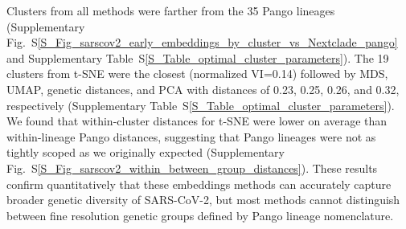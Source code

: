 \documentclass[webpdf,contemporary,large,single]{oup-authoring-template}%
\theoremstyle{thmstyleone}%
\theoremstyle{thmstyletwo}%
\theoremstyle{thmstylethree}%
\begin{document}
Clusters from all methods were farther from the 35 Pango lineages (Supplementary Fig.~S\ref{S_Fig_sarscov2_early_embeddings_by_cluster_vs_Nextclade_pango} and Supplementary Table~S\ref{S_Table_optimal_cluster_parameters}).
The 19 clusters from t-SNE were the closest (normalized VI=0.14) followed by MDS, UMAP, genetic distances, and PCA with distances of 0.23, 0.25, 0.26, and 0.32, respectively (Supplementary Table~S\ref{S_Table_optimal_cluster_parameters}).
We found that within-cluster distances for t-SNE were lower on average than within-lineage Pango distances, suggesting that Pango lineages were not as tightly scoped as we originally expected (Supplementary Fig.~S\ref{S_Fig_sarscov2_within_between_group_distances}).
These results confirm quantitatively that these embeddings methods can accurately capture broader genetic diversity of SARS-CoV-2, but most methods cannot distinguish between fine resolution genetic groups defined by Pango lineage nomenclature.
\end{document}

